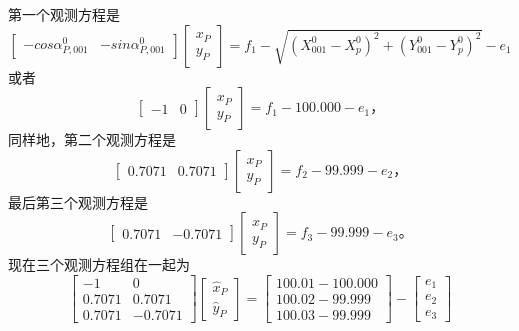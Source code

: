 \par
第一个观测方程是
\begin{equation*}
	\begin{bmatrix}
		- cos{\alpha_{P,001}^{0}} & - sin{\alpha_{P,001}^{0}}
	\end{bmatrix}
	\begin{bmatrix}
		x_P \\ y_P
	\end{bmatrix}
	= f_1 - \sqrt{(X_{001}^{0} - X_{p}^{0})^2 + (Y_{001}^{0} - Y_{p}^{0})^2} - e_1
\end{equation*}
或者
\begin{equation*}
	\begin{bmatrix}
		-1 & 0
	\end{bmatrix}
	\begin{bmatrix}
		x_P \\ y_P
	\end{bmatrix}
	= f_1 - 100.000 - e_1 \text{，}
\end{equation*}
同样地，第二个观测方程是
\begin{equation*}
	\begin{bmatrix}
		0.707 1 & 0.7071
	\end{bmatrix}
	\begin{bmatrix}
		x_P \\ y_P
	\end{bmatrix}
	= f_2 - 99.999 - e_2 \text{，}
\end{equation*}
最后第三个观测方程是
\begin{equation*}
	\begin{bmatrix}
		0.707 1 & -0.7071
	\end{bmatrix}
	\begin{bmatrix}
		x_P \\ y_P
	\end{bmatrix}
	= f_3 - 99.999 - e_3 \text{。}
\end{equation*}
现在三个观测方程组在一起为
\begin{equation*}
	\begin{bmatrix}
		-1 & 0\\
		0.707 1 & 0.7071\\
		0.707 1 & -0.7071
	\end{bmatrix}
	\begin{bmatrix}
		\hat{x}_P \\ \hat{y}_P
	\end{bmatrix}
	= \begin{bmatrix}
		100.01- 100.000\\
		100.02- 99.999\\
		100.03- 99.999
	\end{bmatrix}
	-
	\begin{bmatrix}
		e_1\\
		e_2\\
		e_3
	\end{bmatrix}
\end{equation*}
